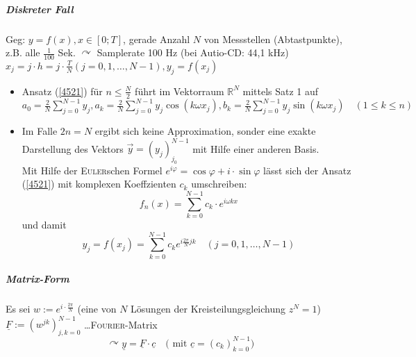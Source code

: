 \documentclass[a4paper]{scrartcl}
\begin{document}
\subparagraph{Diskreter Fall} Geg: $y= f(x) , x \in [0;T]$, gerade Anzahl $N$ von Messstellen (Abtastpunkte), z.B. alle $\frac{1}{100}$ Sek. $\curvearrowright$ Samplerate 100 Hz (bei Autio-CD: 44,1 kHz)\\
$x_j = j \cdot h = j \cdot \frac{T}{N} (j=0,1,\dots,N-1), y_j = f(x_j)$

\begin{itemize}
\item Ansatz (\ref{4521}) für $ n \leq \frac{N}{2}$ führt im Vektorraum $\mathbb{R}^N$ mittels Satz 1 auf $a_0 = \frac{2}{N} \sum\limits_{j=0}^{N-1} y_j, a_k = \frac{2}{N} \sum\limits_{j=0}^{N-1} y_j \cos{(k \omega x_j)}, b_k = \frac{2}{N} \sum\limits_{j=0}^{N-1} y_j \sin{(k \omega x_j)} \quad (1 \leq k \leq n)$
\item Im Falle $2n = N$ ergibt sich keine Approximation, sonder eine exakte Darstellung des Vektors $\vec{y} = (y_j)_{j_0}^{N-1}$ mit Hilfe einer anderen Basis.\\
Mit Hilfe der \textsc{Euler}schen Formel $e^{i\varphi} = \cos{\varphi} + i \cdot \sin{\varphi}$ lässt sich der Ansatz (\ref{4521}) mit komplexen Koeffzienten $c_k$ umschreiben:
\[f_n(x) = \sum\limits_{k=0}^{N-1} c_k  \cdot e^{i \omega k x} \]
und damit 
\begin{equation}\label{4522}y_j = f(x_j) = \sum\limits_{k=0}^{N-1} c_k e^{i\frac{2\pi}{N} jk} \quad (j=0,1,\dots,N-1) \end{equation}
\end{itemize}

\subparagraph{Matrix-Form} Es sei $w:= e^{i \cdot \frac{2 \pi}{N}}$ (eine von $N$ Lösungen der Kreisteilungsgleichung $z^N = 1$)\\
$\underline{F} := \left (w^{jk} \right )_{j,k=0}^{N-1}$ \dots \textsc{Fourier}-Matrix\\
\begin{equation}\label{4523}\curvearrowright \underline{y} = \underline{F} \cdot \underline{c} \quad \text{( mit } \underline{c} = \left (c_k \right )_{k=0}^{N-1}) \end{equation}
\end{document}
